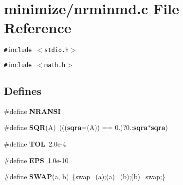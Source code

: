 \section{minimize/nrminmd.c File Reference}
\label{nrminmd_8c}
{\tt \#include $<$stdio.h$>$}\par
{\tt \#include $<$math.h$>$}\par
\subsection*{Defines}
\begin{CompactItemize}
\item 
\#define {\bf NRANSI}
\item 
\#define {\bf SQR}(A)~((({\bf sqra}=(A)) == 0.)?0.:{\bf sqra}$\ast${\bf sqra})
\item 
\#define {\bf TOL}~2.0e-4
\item 
\#define {\bf EPS}~1.0e-10
\item 
\#define {\bf SWAP}(a, b)~\{swap=(a);(a)=(b);(b)=swap;\}
\end{CompactItemize}
